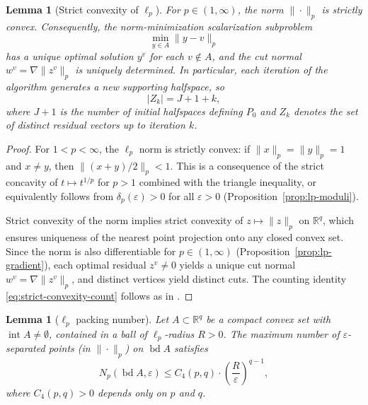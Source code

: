 \documentclass[11pt]{article}
\newtheorem{lemma}[theorem]{Lemma}
\newcommand{\R}{\mathbb{R}}
\begin{document}
\begin{lemma}[Strict convexity of $\ell_p$]\label{lem:strict-convexity}
For $p \in (1, \infty)$, the norm $\|\cdot\|_p$ is strictly convex. Consequently, the norm-minimization scalarization subproblem
\[
\min_{y \in A} \|y - v\|_p
\]
has a unique optimal solution $y^v$ for each $v \notin A$, and the cut normal $w^v = \nabla\|z^v\|_p$ is uniquely determined. In particular, each iteration of the algorithm generates a new supporting halfspace, so
\begin{equation}\label{eq:strict-convexity-count}
|Z_k| = J + 1 + k,
\end{equation}
where $J + 1$ is the number of initial halfspaces defining $P_0$ and $Z_k$ denotes the set of distinct residual vectors up to iteration $k$.
\end{lemma}

\begin{proof}
For $1 < p < \infty$, the $\ell_p$ norm is strictly convex: if $\|x\|_p = \|y\|_p = 1$ and $x \neq y$, then $\|(x+y)/2\|_p < 1$. This is a consequence of the strict concavity of $t \mapsto t^{1/p}$ for $p > 1$ combined with the triangle inequality, or equivalently follows from $\delta_p(\varepsilon) > 0$ for all $\varepsilon > 0$ (Proposition~\ref{prop:lp-moduli}).

Strict convexity of the norm implies strict convexity of $z \mapsto \|z\|_p$ on $\R^q$, which ensures uniqueness of the nearest point projection onto any closed convex set. Since the norm is also differentiable for $p \in (1,\infty)$ (Proposition~\ref{prop:lp-gradient}), each optimal residual $z^v \neq 0$ yields a unique cut normal $w^v = \nabla\|z^v\|_p$, and distinct vertices yield distinct cuts. The counting identity \eqref{eq:strict-convexity-count} follows as in \cite[Lemma~7.7]{Ararat2024}.
\end{proof}

\begin{lemma}[$\ell_p$ packing number]\label{lem:packing}
Let $A \subset \R^q$ be a compact convex set with $\operatorname{int} A \neq \emptyset$, contained in a ball of $\ell_p$-radius $R > 0$. The maximum number of $\varepsilon$-separated points (in $\|\cdot\|_p$) on $\operatorname{bd} A$ satisfies
\begin{equation}\label{eq:packing-bound}
N_p(\operatorname{bd} A, \varepsilon) \le C_4(p, q) \cdot \left(\frac{R}{\varepsilon}\right)^{q-1},
\end{equation}
where $C_4(p, q) > 0$ depends only on $p$ and $q$.
\end{lemma}
\end{document}
